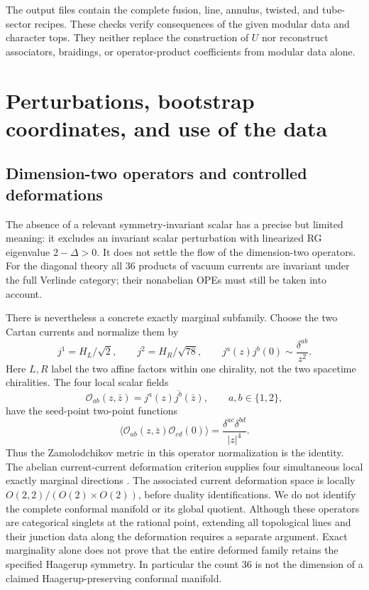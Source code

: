 \documentclass[11pt,a4paper]{article}
\theoremstyle{definition}
\begin{document}
The output files contain the complete fusion, line, annulus, twisted,
and tube-sector recipes. These checks verify consequences of the
given modular data and character tops. They neither replace the
construction of $U$ nor reconstruct associators, braidings, or
operator-product coefficients from modular data alone.

\section{Perturbations, bootstrap coordinates, and use of the data}
\label{sec:physics-data-guide}

\subsection{Dimension-two operators and controlled deformations}

The absence of a relevant symmetry-invariant scalar has a precise but
limited meaning: it excludes an invariant scalar perturbation with
linearized RG eigenvalue $2-\Delta>0$. It does not settle the flow of
the dimension-two operators. For the diagonal theory all $36$ products
of vacuum currents are invariant under the full Verlinde category;
their nonabelian OPEs must still be taken into account.

There is nevertheless a concrete exactly marginal subfamily. Choose
the two Cartan currents and normalize them by
\[
 j^1=H_L/\sqrt2,\qquad j^2=H_R/\sqrt{78},\qquad
 j^a(z)j^b(0)\sim\frac{\delta^{ab}}{z^2}.
\]
Here $L,R$ label the two affine factors within one chirality, not the
two spacetime chiralities. The four local scalar fields
\begin{equation}\label{eq:physics-abelian-deformations}
 \mathcal O_{ab}(z,\bar z)=j^a(z)\overline{j^b}(\bar z),
 \qquad a,b\in\{1,2\},
\end{equation}
have the seed-point two-point functions
\[
 \langle\mathcal O_{ab}(z,\bar z)\mathcal O_{cd}(0)\rangle
 =\frac{\delta^{ac}\delta^{bd}}{|z|^4}.
\]
Thus the Zamolodchikov metric in this operator normalization is the
identity. The abelian current-current deformation criterion supplies
four simultaneous local exactly marginal directions
\cite[Section 2]{FR}. The associated current deformation space is locally
$O(2,2)/(O(2)\times O(2))$, before duality identifications. We do not
identify the complete conformal manifold or its global quotient.
Although these operators are categorical singlets at the rational
point, extending all topological lines and their junction data along
the deformation requires a separate argument. Exact marginality alone
does not prove that the entire deformed family retains the specified
Haagerup symmetry. In particular the count $36$ is not the dimension
of a claimed Haagerup-preserving conformal manifold.
\end{document}
